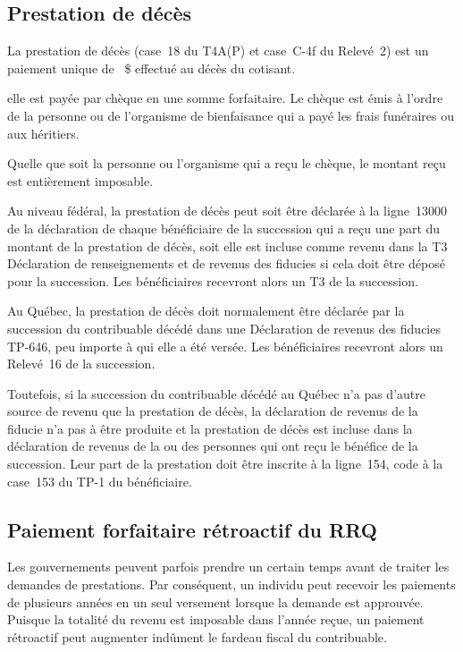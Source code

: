 \subsection{Prestation de décès}
La prestation de décès (case~18 du T4A(P) et case~C-4f du Relevé~2) est un paiement unique de ~\$ effectué au décès du cotisant.

elle est payée par chèque en une somme forfaitaire. Le chèque est émis à l'ordre de la personne ou de l'organisme de bienfaisance qui a payé les frais funéraires ou aux héritiers.

Quelle que soit la personne ou l'organisme qui a reçu le chèque, le montant reçu est entièrement imposable.

Au niveau fédéral, la prestation de décès peut soit être déclarée à la ligne~13000 de la déclaration de chaque bénéficiaire de la succession qui a reçu une part du montant de la prestation de décès, soit elle est incluse comme revenu dans la T3 Déclaration de renseignements et de revenus des fiducies si cela doit être déposé pour la succession. Les bénéficiaires recevront alors un T3 de la succession.

Au Québec, la prestation de décès doit normalement être déclarée par la succession du contribuable décédé dans une Déclaration de revenus des fiducies TP-646, peu importe à qui elle a été versée. Les bénéficiaires recevront alors un Relevé~16 de la succession.

Toutefois, si la succession du contribuable décédé au Québec n'a pas d'autre source de revenu que la prestation de décès, la déclaration de revenus de la fiducie n'a pas à être produite et la prestation de décès est incluse dans la déclaration de revenus de la ou des personnes qui ont reçu le bénéfice de la succession. Leur part de la prestation doit être inscrite à la ligne~154, code  \fg{} à la case~153 du TP-1 du bénéficiaire.


\subsection{Paiement forfaitaire rétroactif du RRQ}
Les gouvernements peuvent parfois prendre un certain temps avant de traiter les demandes de prestations. Par conséquent, un individu peut recevoir les paiements de plusieurs années en un seul versement lorsque la demande est approuvée. Puisque la totalité du revenu est imposable dans l'année reçue, un paiement rétroactif peut augmenter indûment le fardeau fiscal du contribuable.

